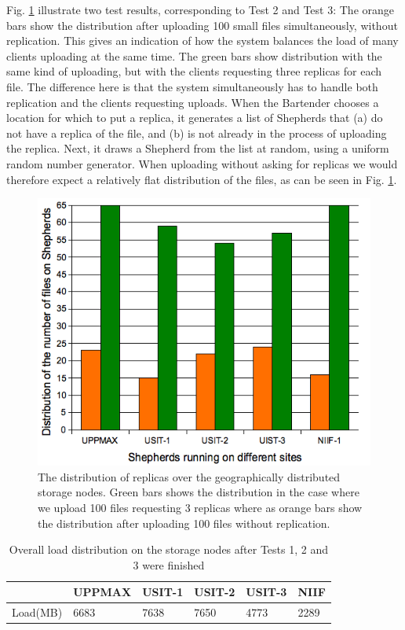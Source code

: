 \documentclass[final]{ieee}
\begin{document}
Fig. \ref{fig:FileDistribution} illustrate two test results,
corresponding to Test 2 and Test 3: The orange bars show the distribution after uploading 100 small files
simultaneously, without replication. This gives an indication of how
the system balances the load of many clients uploading at the same
time. The green bars show distribution with the same kind of
uploading, but with the clients requesting three replicas for each file. The
difference here is that the system simultaneously has to handle both
replication and the clients requesting uploads. When the Bartender chooses
a location for which to put a replica, it generates a list of
Shepherds that (a) do not have a replica of the file, and (b) is not
already in the process of uploading the replica. Next, it draws a
Shepherd from the list at random, using a uniform random number
generator. When uploading without asking for replicas we would
therefore expect a relatively flat distribution of the files, as can
be seen in Fig. \ref{fig:FileDistribution}. 

\begin{figure}
\centering
\includegraphics[width=0.8\columnwidth]{FileDistribution}
\caption{The distribution of replicas over the geographically distributed
  storage nodes. Green bars shows the distribution in the case where
  we upload 100 files requesting 3 replicas where as orange bars show
  the distribution after uploading 100 files without replication. }
\label{fig:FileDistribution}
\end{figure}

\begin{table}[ht]
\centering
\begin{tabular}[width = \columnwidth]{llllll}
\hline \hline
&\small{UPPMAX}&\small{USIT-1}&\small{USIT-2}&\small{USIT-3}&\small{NIIF}\\
\hline
           \small{Load(MB)}&6683&7638&7650&4773&2289\\
\hline
\end{tabular}
\caption{Overall load distribution on the storage nodes after Tests 1,
2 and 3 were finished}
\label{table:load distribution}  
\end{table}
\end{document}
